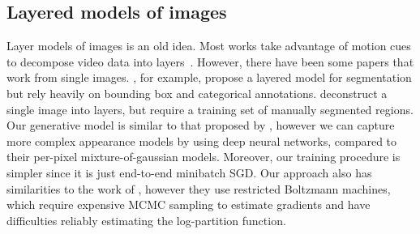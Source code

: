 \subsection{Layered models of images}\vspace{-2mm}

Layer models of images is an old idea.
Most works take advantage of motion cues to decompose video data into layers~\citep{darrell1991robust,wang1994representing,ayer1995layered,kannan2005generative,kannan2008fast}.
However, there have been some papers that work from single images.
\cite{yang2012layered}, for example, propose a layered model for
segmentation but rely heavily on bounding box and categorical
annotations.	
\cite{Isola2013} deconstruct a single image into layers, but require a
training set of manually segmented regions.
Our generative model is similar to that proposed by \cite{williams2004greedy}, however we can capture more complex
appearance models by using deep neural networks, compared to their per-pixel mixture-of-gaussian models.  Moreover,
our training procedure is simpler since it is just end-to-end minibatch SGD.
Our approach also has similarities to the work of \cite{le2011learning}, however  they use restricted Boltzmann machines, 
which require expensive MCMC sampling to estimate gradients and have difficulties reliably estimating the 
log-partition function.  
\vspace{-2mm}
	
	
	


	
	
	
		
	
	
	
	
	
	
	

